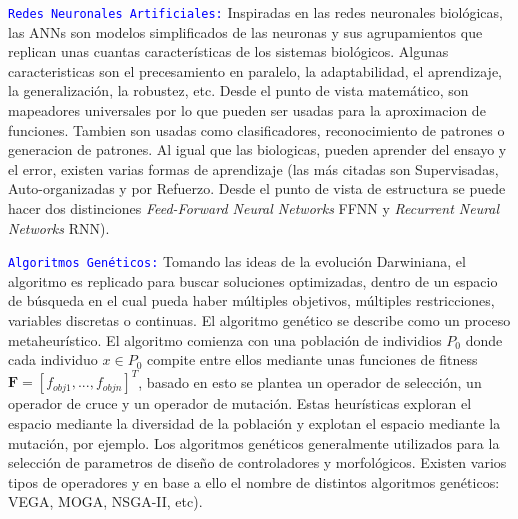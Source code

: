 \documentclass[10pt,onecolumn,twoside,letterpaper]{article}
\begin{document}
\par \textcolor{blue}{\texttt{Redes Neuronales Artificiales:}} Inspiradas en las redes neuronales biol\'ogicas, las ANNs son modelos simplificados de las neuronas y sus agrupamientos que replican unas cuantas caracter\'isticas de los sistemas biol\'ogicos. Algunas caracteristicas son el precesamiento en paralelo, la adaptabilidad, el aprendizaje, la generalizaci\'on, la robustez, etc. Desde el punto de vista matem\'atico, son mapeadores universales por lo que pueden ser usadas para la aproximacion de funciones. Tambien son usadas como clasificadores, reconocimiento de patrones o generacion de patrones. Al igual que las biologicas, pueden aprender del ensayo y el error, existen varias formas de aprendizaje (las m\'as citadas son Supervisadas, Auto-organizadas y por Refuerzo. Desde el punto de vista de estructura se puede hacer dos distinciones \emph{Feed-Forward Neural Networks} FFNN y \emph{Recurrent Neural Networks} RNN)\cite{looney1997}.
\par \textcolor{blue}{\texttt{Algoritmos Gen\'eticos:}} Tomando las ideas de la evoluci\'on Darwiniana, el algoritmo es replicado para buscar soluciones optimizadas, dentro de un espacio de b\'usqueda en el cual pueda haber m\'ultiples objetivos, m\'ultiples restricciones, variables discretas o continuas. El algoritmo gen\'etico se describe como un proceso metaheur\'istico. El algoritmo comienza con una poblaci\'on de individios $P_0$ donde cada individuo $x \in P_0$ compite entre ellos mediante unas funciones de fitness $\mathbf{F}=[f_{obj1},...,f_{objn}]^T$, basado en esto se plantea un operador de selecci\'on, un operador de cruce y un operador de mutaci\'on. Estas heur\'isticas exploran el espacio mediante la diversidad de la poblaci\'on y explotan el espacio mediante la mutaci\'on, por ejemplo. Los algoritmos gen\'eticos generalmente utilizados para la selecci\'on de parametros de dise\~no de controladores y morfol\'ogicos. Existen varios tipos de operadores y en base a ello el nombre de distintos algoritmos gen\'eticos: VEGA, MOGA, NSGA-II, etc)\cite{looney1997,russell2004}. 

\end{document}
